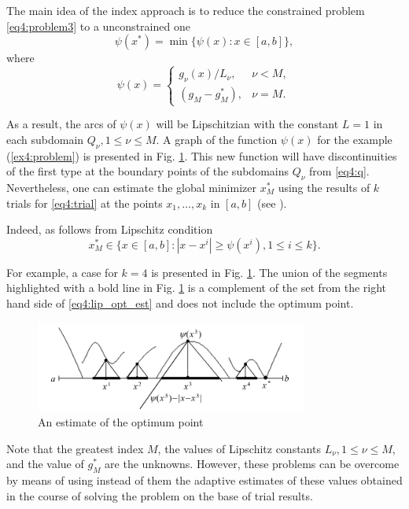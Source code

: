 \documentclass[graybox]{svmult}
\begin{document}
The main idea of the index approach is to reduce the constrained problem \eqref{eq4:problem3} to a unconstrained one
\begin{displaymath}
  \psi(x^*)=\min\{\psi(x):x\in[a,b]\},
\end{displaymath}
where
\begin{equation}
  \psi(x)=
  \begin{cases}
    g_\nu(x)/L_\nu, & \nu < M, \\
    (g_M-g_M^*), & \nu=M.
  \end{cases}
\end{equation}

As a result, the arcs of $\psi(x)$ will be Lipschitzian with the constant $L=1$ in each subdomain $Q_\nu,1\le\nu\le M$. A graph of the function $\psi(x)$ for the example (\ref{ex4:problem}) is presented in Fig. \ref{fig:4_4}. This new function will have discontinuities of the first type at the boundary points of the subdomains $Q_\nu$ from \eqref{eq4:q}. Nevertheless, one can estimate the global minimizer $x^*_M$ using the results of $k$ trials for \eqref{eq4:trial} at the points $x_1,\dots, x_k$ in $[a,b]$ (see \cite{3}).

Indeed, as follows from Lipschitz condition
\begin{equation}
  \label{eq4:lip_opt_est}
  x^*_M\in\{x\in[a,b]:|x-x^i|\ge\psi(x^i),1\le i\le k\}.
\end{equation}

For example, a case for $k=4$ is presented in Fig. \ref{fig:4_4}. The union of the segments highlighted with a bold line in Fig. \ref{fig:4_4} is a complement of the set from the right hand side of \eqref{eq4:lip_opt_est} and does not include the optimum point.
\begin{figure}[h]
  \label{fig:4_4}
  \centering
  \includegraphics[width=0.8\textwidth]{figures/4_4.png}
  \caption{An estimate of the optimum point}
\end{figure}

Note that the greatest index $M$, the values of Lipschitz constants $L_\nu, 1\le \nu\le M$, and the value of $g_M^*$ are the unknowns. However, these problems can be overcome by means of using instead of them the adaptive estimates of these values obtained in the course of solving the problem on the base of trial results.
\end{document}
